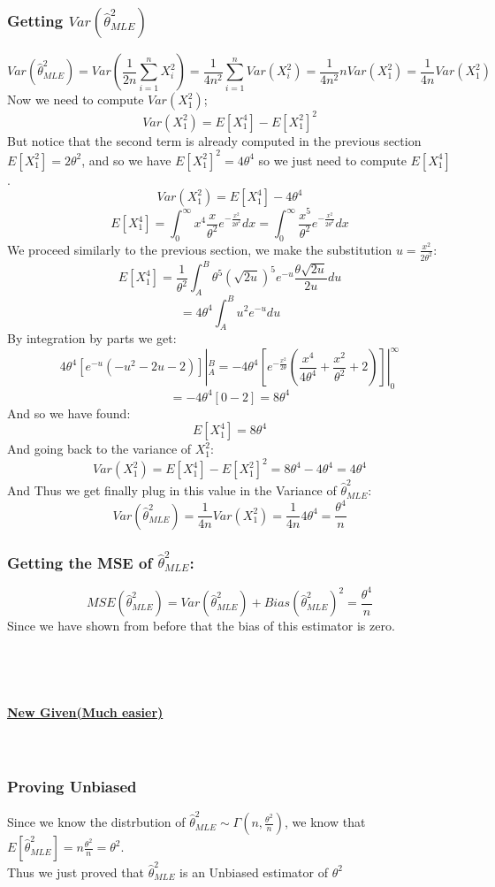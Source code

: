 \documentclass[12pt]{article}
\begin{document}
\subsubsection*{Getting $Var(\hat{\theta}^2_{MLE})$}
\[
  Var(\hat{\theta}^2_{MLE}) = Var(\frac{1}{2n} \sum_{i=1}^{n} X_i^2) = \frac{1}{4n^2} \sum_{i=1}^{n} Var(X_i^2) = \frac{1}{4n^2} n Var(X_1^2) = \frac{1}{4n} Var(X_1^2)
\]
Now we need to compute $Var(X_1^2)$;
\[
  Var(X_1^2) = E[X_1^4] - E[X_1^2]^2
\]
But notice that the second term is already computed in the previous section $E[X_1^2] = 2\theta^2$, and so we have $E[X_1^2]^2 = 4\theta^4$ so we just need to compute $E[X_1^4]$.
\[
  Var(X_1^2) = E[X_1^4] - 4\theta^4
\]
\[
  E[X_1^4] = \int_{0}^{\infty} x^4\frac{x}{\theta^2}e^{-\frac{x^2}{2\theta^2}} dx = \int_{0}^{\infty} \frac{x^5}{\theta^2}e^{-\frac{x^2}{2\theta^2}} dx
\]
We proceed similarly to the previous section, we make the substitution $u = \frac{x^2}{2\theta^2}$:
\[
  E[X_1^4] = \frac{1}{\theta^2} \int_{A}^{B} \theta^5 (\sqrt{2u})^5 e^{-u} \frac{\theta\sqrt{2u}}{2u}du
\]
\[
  = 4\theta^4 \int_{A}^{B} u^{2}e^{-u} du
\]
By integration by parts we get:
\[
  4\theta^4 [e^{-u}(-u^2-2u-2)]|^{B}_{A} = -4\theta^4 [e^{-\frac{x^2}{2\theta}}(\frac{x^4}{4\theta^4}+\frac{x^2}{\theta^2}+2)]|^{\infty}_{0}
\]
\[
  = -4\theta^4[0-2] = 8\theta^4
\]
And so we have found:
\[
  E[X_1^4] = 8\theta^4
\]
And going back to the variance of $X_1^2$:
\[
  Var(X_1^2) = E[X_1^4] - E[X_1^2]^2 = 8\theta^4 - 4\theta^4 = 4\theta^4
\]
And Thus we get finally plug in this value in the Variance of $\hat{\theta}^2_{MLE}$:
\[
  Var(\hat{\theta}^2_{MLE}) = \frac{1}{4n} Var(X_1^2) = \frac{1}{4n} 4\theta^4 = \frac{\theta^4}{n}
\]
\subsubsection*{Getting the MSE of $\hat{\theta}^2_{MLE}$:}
\[
  MSE(\hat{\theta}^2_{MLE}) = Var(\hat{\theta}^2_{MLE}) + Bias(\hat{\theta}^2_{MLE})^2 = \frac{\theta^4}{n}
\]
Since we have shown from before that the bias of this estimator is zero. \\ \\ \\ \\ \\
\textbf{\underline{New Given(Much easier)}}
\\ \\ \\

\subsubsection*{Proving Unbiased}
Since we know the distrbution of $\hat{\theta}^2_{MLE} \sim \Gamma(n,\frac{\theta^2}{n})$, we know that $E[\hat{\theta}^2_{MLE}] = n \frac{\theta^2}{n} = \theta^2$. \\
Thus we just proved that $\hat{\theta}^2_{MLE}$ is an Unbiased estimator of $\theta^2$
\end{document}

